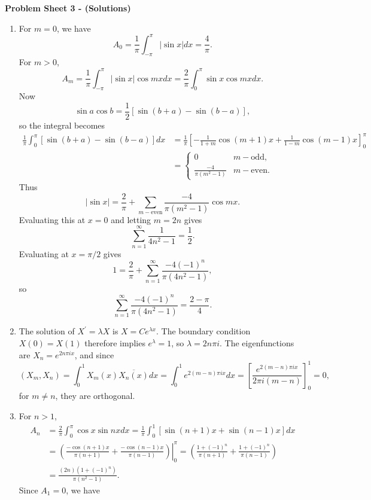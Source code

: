 \documentclass[11pt,a4paper]{article}
\begin{document}
	\begin{center}
		\textbf{Problem Sheet 3 - (Solutions)}
	\end{center}
	\begin{enumerate}
		\item For $m = 0$, we have
		$$
		A_0 = \frac{1}{\pi}\int_{-\pi}^\pi |\sin x|dx = \frac{4}{\pi}.
		$$
		For $m > 0$,
		$$
		A_m = \frac{1}{\pi}\int_{-\pi}^\pi |\sin x|\cos mx dx = \frac{2}{\pi}\int_0^\pi\sin x\cos mx dx.
		$$
		Now
		$$
		\sin a \cos b = \frac{1}{2}[\sin(b+a) - \sin(b - a)],
		$$
		so the integral becomes
		\begin{align*}
			\frac{1}{\pi}\int_0^\pi[\sin(b + a) - \sin(b - a)]dx
			&= \frac{1}{\pi}\left[-\frac{1}{1 + m}\cos (m + 1)x + \frac{1}{1 - m}\cos(m - 1)x\right]_0^\pi\\
			&=
			\begin{cases}
				0 & m - \text{odd},\\
				\frac{-4}{\pi(m^2 - 1)} & m - \text{even}.
			\end{cases}
		\end{align*}
		Thus
		$$
		|\sin x| = \frac{2}{\pi} + \sum_{m-\text{even}} \frac{-4}{\pi(m^2 - 1)}\cos mx.
		$$
		Evaluating this at $x = 0$ and letting $m = 2n$ gives
		$$
		\sum_{n = 1}^\infty\frac{1}{4n^2 - 1} = \frac{1}{2}.
		$$
		Evaluating at $x = \pi/2$ gives
		$$
		1 = \frac{2}{\pi} + \sum_{n = 1}^\infty \frac{-4(-1)^n}{\pi(4n^2 - 1)},
		$$
		so
		$$
		\sum_{n=1}^\infty \frac{-4(-1)^n}{\pi(4n^2 - 1)} = \frac{2 - \pi}{4}.
		$$
		\item The solution of $X^\prime = \lambda X$ is $X = Ce^{\lambda x}$. The boundary condition $X(0) = X(1)$ therefore implies $e^\lambda = 1$, so $\lambda = 2n\pi i$. The eigenfunctions are $X_n = e^{2n\pi ix}$, and since
		$$
		(X_m, X_n) = \int_0^1 X_m(x)\overline{X_n(x)}dx = \int_0^1 e^{2(m-n)\pi ix}dx = \left[\frac{e^{2(m-n)\pi i x}}{2\pi i (m - n)}\right]_0^1 = 0,
		$$
		for $m \neq n$, they are orthogonal.
		\item For $n > 1$,
		\begin{align*}
			A_n
			&= \frac{2}{\pi}\int_0^\pi\cos x\sin nx dx = \frac{1}{\pi}\int_0^1[\sin (n+1)x + \sin(n-1)x]dx\\
			&= \left.\left(\frac{-\cos(n+1)x}{\pi(n + 1)} + \frac{-\cos (n-1)x}{\pi(n-1)}\right)\right|_0^\pi = \left(\frac{1 + (-1)^n}{\pi(n+1)} + \frac{1 + (-1)^n}{\pi(n - 1)}\right)\\
			&= \frac{(2n)(1 + (-1)^n)}{\pi(n^2 - 1)}.
		\end{align*}
		Since $A_1 = 0$, we have

\end{enumerate}
\end{document}
